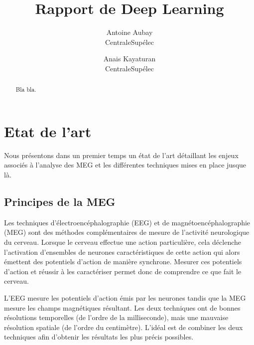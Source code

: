 \documentclass[10pt,twocolumn,letterpaper]{article}
\begin{document}
\title{Rapport de Deep Learning}

\author{Antoine Aubay\\
	CentraleSupélec\\
	\and
	Anais Kayaturan\\
	CentraleSupélec\\
}

\maketitle

\begin{abstract}
   Bla bla.
\end{abstract}

\section{Etat de l'art}

Nous présentons dans un premier temps un état de l'art détaillant les enjeux associés à l'analyse des MEG et les différentes techniques mises en place jusque là.

\subsection{Principes de la MEG}

Les techniques d'électroencéphalographie (EEG) et de magnétoencéphalographie (MEG) sont des méthodes complémentaires de mesure de l'activité neurologique du cerveau. Lorsque le cerveau effectue une action particulière, cela déclenche l'activation d'ensembles de neurones caractéristiques de cette action qui alors émettent des potentiels d'action de manière synchrone. Mesurer ces potentiels d'action et réussir à les caractériser permet donc de comprendre ce que fait le cerveau.

L'EEG mesure les potentiels d'action émis par les neurones tandis que la MEG mesure les champs magnétiques résultant. Les deux techniques ont de bonnes résolutions temporelles (de l'ordre de la milliseconde), mais une mauvaise résolution spatiale (de l'ordre du centimètre). L'idéal est de combiner les deux techniques afin d'obtenir les résultats les plus précis possibles.
\end{document}
